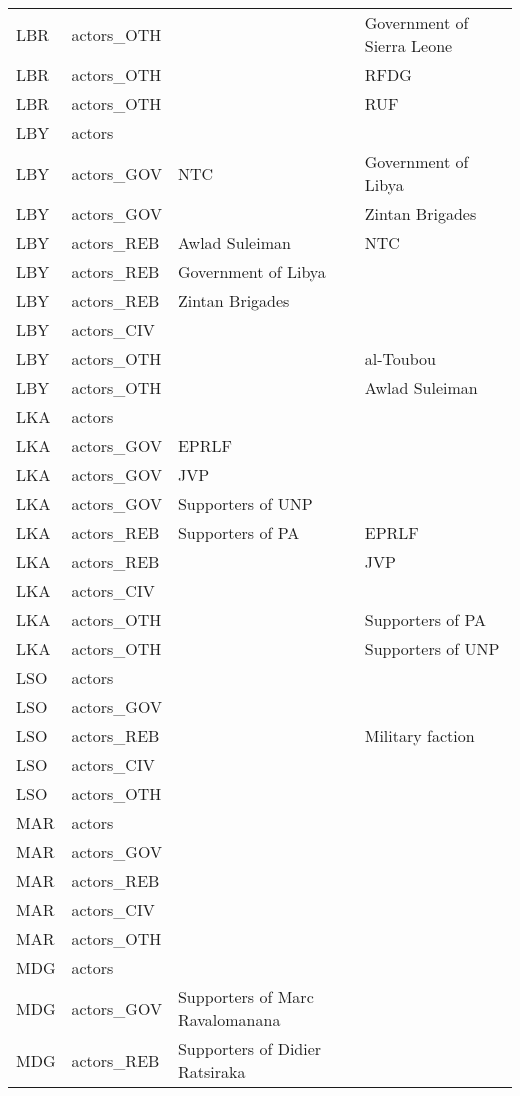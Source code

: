 \begin{table}[ht]
\begin{tabular}{llll}
  LBR & actors\_OTH &  & Government of Sierra Leone \\ 
  LBR & actors\_OTH &  & RFDG \\ 
  LBR & actors\_OTH &  & RUF \\ 
  LBY & actors &  &  \\ 
  LBY & actors\_GOV & NTC & Government of Libya \\ 
  LBY & actors\_GOV &  & Zintan Brigades \\ 
  LBY & actors\_REB & Awlad Suleiman & NTC \\ 
  LBY & actors\_REB & Government of Libya &  \\ 
  LBY & actors\_REB & Zintan Brigades &  \\ 
  LBY & actors\_CIV &  &  \\ 
  LBY & actors\_OTH &  & al-Toubou \\ 
  LBY & actors\_OTH &  & Awlad Suleiman \\ 
  LKA & actors &  &  \\ 
  LKA & actors\_GOV & EPRLF &  \\ 
  LKA & actors\_GOV & JVP &  \\ 
  LKA & actors\_GOV & Supporters of UNP &  \\ 
  LKA & actors\_REB & Supporters of PA & EPRLF \\ 
  LKA & actors\_REB &  & JVP \\ 
  LKA & actors\_CIV &  &  \\ 
  LKA & actors\_OTH &  & Supporters of PA \\ 
  LKA & actors\_OTH &  & Supporters of UNP \\ 
  LSO & actors &  &  \\ 
  LSO & actors\_GOV &  &  \\ 
  LSO & actors\_REB &  & Military faction \\ 
  LSO & actors\_CIV &  &  \\ 
  LSO & actors\_OTH &  &  \\ 
  MAR & actors &  &  \\ 
  MAR & actors\_GOV &  &  \\ 
  MAR & actors\_REB &  &  \\ 
  MAR & actors\_CIV &  &  \\ 
  MAR & actors\_OTH &  &  \\ 
  MDG & actors &  &  \\ 
  MDG & actors\_GOV & Supporters of Marc Ravalomanana &  \\ 
  MDG & actors\_REB & Supporters of Didier Ratsiraka &  \\ 

\end{tabular}
\end{table}
